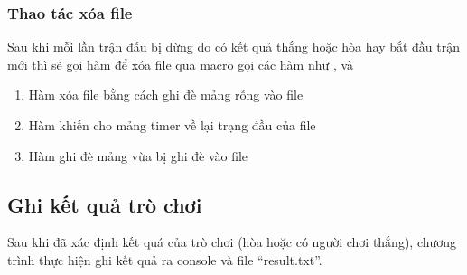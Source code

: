 \subsubsection{Thao tác xóa file}
Sau khi mỗi lần trận đấu bị dừng do có kết quả thắng hoặc hòa hay bắt đầu trận mới thì sẽ gọi hàm để xóa file qua macro  gọi các hàm như ,  và 
\begin{enumerate}
   \item Hàm  xóa file bằng cách ghi đè mảng rỗng vào file 
   \item Hàm  khiến cho mảng timer về lại trạng đầu của file 
   \item Hàm  ghi đè mảng  vừa bị ghi đè vào file 
\end{enumerate}
\subsection{Ghi kết quả trò chơi}
Sau khi đã xác định kết quá của trò chơi (hòa hoặc có người chơi thắng), chương trình thực hiện ghi kết quả ra console và file ``result.txt''. 

